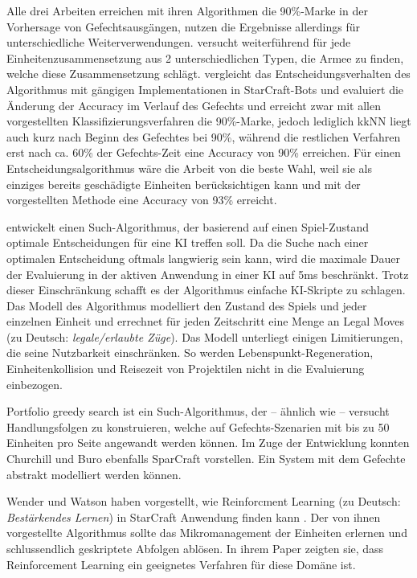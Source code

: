 Alle drei Arbeiten erreichen mit ihren Algorithmen die 90\%-Marke in der Vorhersage von Gefechtsausgängen, nutzen die Ergebnisse allerdings für unterschiedliche Weiterverwendungen. \textcite{AIIDE137381} versucht weiterführend für jede Einheitenzusammensetzung aus 2 unterschiedlichen Typen, die Armee zu finden, welche diese Zusammensetzung schlägt. \textcite{AIIDE1511531} vergleicht das Entscheidungsverhalten des Algorithmus mit gängigen Implementationen in StarCraft-Bots und \textcite{SnchezRuizGranados2015PredictingTO} evaluiert die Änderung der Accuracy im Verlauf des Gefechts und erreicht zwar mit allen vorgestellten Klassifizierungsverfahren die 90\%-Marke, jedoch lediglich kkNN liegt auch kurz nach Beginn des Gefechtes bei 90\%, während die restlichen Verfahren erst nach ca. 60\% der Gefechts-Zeit eine Accuracy von 90\% erreichen. Für einen Entscheidungsalgorithmus wäre die Arbeit von \textcite{AIIDE1511531} die beste Wahl, weil sie als einziges bereits geschädigte Einheiten berücksichtigen kann und mit der vorgestellten Methode eine Accuracy von 93\% erreicht. 

\textcite{DBLP:conf/aiide/ChurchillSB12} entwickelt einen Such-Algorithmus, der basierend auf einen Spiel-Zustand optimale Entscheidungen für eine KI treffen soll. Da die Suche nach einer optimalen Entscheidung oftmals langwierig sein kann, wird die maximale Dauer der Evaluierung in der aktiven Anwendung in einer KI auf 5ms beschränkt. Trotz dieser Einschränkung schafft es der Algorithmus einfache KI-Skripte zu schlagen. Das Modell des Algorithmus modelliert den Zustand des Spiels und jeder einzelnen Einheit und errechnet für jeden Zeitschritt eine Menge an Legal Moves (zu Deutsch: \textit{legale/erlaubte Züge}). Das Modell unterliegt einigen Limitierungen, die seine Nutzbarkeit einschränken. So werden Lebenspunkt-Regeneration, Einheitenkollision und Reisezeit von Projektilen nicht in die Evaluierung einbezogen. 

Portfolio greedy search \parencite{6633643} ist ein Such-Algorithmus, der -- ähnlich wie \textcite{DBLP:conf/aiide/ChurchillSB12} -- versucht Handlungsfolgen zu konstruieren, welche auf Gefechts-Szenarien mit bis zu 50 Einheiten pro Seite angewandt werden können. Im Zuge der Entwicklung konnten Churchill und Buro ebenfalls SparCraft vorstellen. Ein System mit dem Gefechte abstrakt modelliert werden können. 

Wender und Watson haben vorgestellt, wie Reinforcment Learning (zu Deutsch: \textit{Bestärkendes Lernen}) in StarCraft Anwendung finden kann \parencite{6374183}. Der von ihnen vorgestellte Algorithmus sollte das Mikromanagement der Einheiten erlernen und schlussendlich geskriptete Abfolgen ablösen. In ihrem Paper zeigten sie, dass Reinforcement Learning ein geeignetes Verfahren für diese Domäne ist. 

